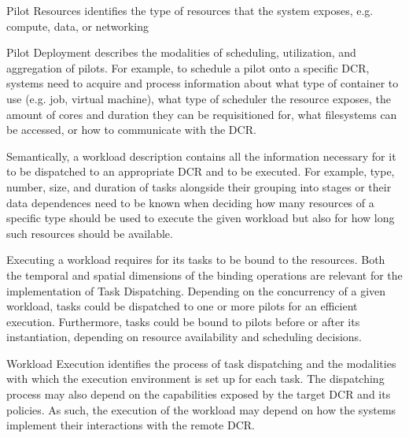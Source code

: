 Pilot Resources identifies the type of resources that the \pilot system exposes,
e.g. compute, data, or networking

Pilot Deployment describes the modalities of scheduling, utilization, and
aggregation of pilots.
For example, to schedule a pilot onto a specific DCR, \pilot systems need to
acquire and process information about what type of container to use (e.g. job,
virtual machine), what type of scheduler the resource exposes, the amount of
cores and duration they can be requisitioned for, what filesystems can be
accessed, or how to communicate with the DCR.

Semantically, a workload description contains all the information necessary for
it to be dispatched to an appropriate DCR and to be executed.
For example, type,
number, size, and duration of tasks alongside their grouping into stages or
their data dependences need to be known when deciding how many resources of a
specific type should be used to execute the given workload but also for how long
such resources should be available.

Executing a workload requires for its tasks to be bound to the resources. Both
the temporal and spatial dimensions of the binding operations are relevant for
the implementation of Task Dispatching.
Depending on the concurrency of a given workload, tasks could be dispatched to
one or more pilots for an efficient execution. Furthermore, tasks could be bound
to pilots before or after its instantiation, depending on resource availability
and scheduling decisions.

Workload Execution identifies the process of task dispatching and the modalities
with which the execution environment is set up for each task. The dispatching
process may also depend on the capabilities exposed by the target DCR and its
policies. As such, the execution of the workload may depend on how the \pilot
systems implement their interactions with the remote DCR.

